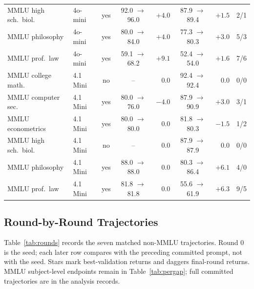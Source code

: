\documentclass[10pt]{article} %
\begin{document}
\begin{table}[htbp]
\begin{center}
\begin{tabular}{llccrcrc}
\rowcolor{softgreen}MMLU high sch.\ biol. & 4o-mini & yes & 92.0 $\rightarrow$ 96.0 & $+4.0$ & 87.9 $\rightarrow$ 89.4 & $+1.5$ & 2/1 \\
\rowcolor{softgreen}MMLU philosophy & 4o-mini & yes & 80.0 $\rightarrow$ 84.0 & $+4.0$ & 77.3 $\rightarrow$ 80.3 & $+3.0$ & 5/3 \\
\rowcolor{softgreen}MMLU prof.\ law & 4o-mini & yes & 59.1 $\rightarrow$ 68.2 & $+9.1$ & 52.4 $\rightarrow$ 54.0 & $+1.6$ & 7/6 \\
\midrule
MMLU college math. & 4.1 Mini & no & -- & 0.0 & 92.4 $\rightarrow$ 92.4 & 0.0 & 0/0 \\
\rowcolor{softgreen}MMLU computer sec. & 4.1 Mini & yes & 80.0 $\rightarrow$ 76.0 & $-4.0$ & 87.9 $\rightarrow$ 90.9 & $+3.0$ & 3/1 \\
MMLU econometrics & 4.1 Mini & yes & 80.0 $\rightarrow$ 80.0 & 0.0 & 81.8 $\rightarrow$ 80.3 & $-1.5$ & 1/2 \\
MMLU high sch.\ biol. & 4.1 Mini & no & -- & 0.0 & 87.9 $\rightarrow$ 87.9 & 0.0 & 0/0 \\
\rowcolor{softgreen}MMLU philosophy & 4.1 Mini & yes & 88.0 $\rightarrow$ 88.0 & 0.0 & 80.3 $\rightarrow$ 86.4 & $+6.1$ & 4/0 \\
\rowcolor{softgreen}MMLU prof.\ law & 4.1 Mini & yes & 81.8 $\rightarrow$ 81.8 & 0.0 & 55.6 $\rightarrow$ 61.9 & $+6.3$ & 9/5 \\
\bottomrule
\end{tabular}
\end{center}
\end{table}

\FloatBarrier
\subsection{Round-by-Round Trajectories}
\label{app:rounds}
Table~\ref{tab:rounds} records the seven matched non-MMLU trajectories. Round 0 is the seed; each later row compares
with the preceding committed prompt, not with the seed. Stars mark best-validation returns and daggers final-round
returns. MMLU subject-level endpoints remain in Table~\ref{tab:pergap}; full committed trajectories are in the analysis records.
\end{document}
